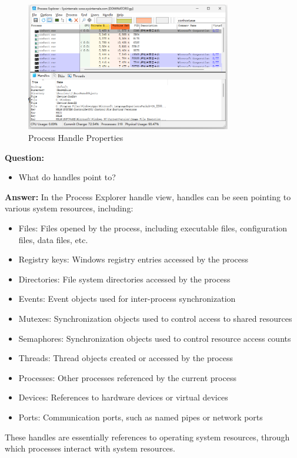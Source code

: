 \documentclass[12pt,a4paper]{article}
\begin{document}
\begin{figure}[H]
    \centering
    \includegraphics[width=0.8\textwidth]{handles.png}
    \caption{Process Handle Properties}
    \label{fig:handles}
\end{figure}

\textbf{Question:}
\begin{itemize}
    \item What do handles point to?
\end{itemize}

\textbf{Answer:}
In the Process Explorer handle view, handles can be seen pointing to various system resources, including:
\begin{itemize}
    \item Files: Files opened by the process, including executable files, configuration files, data files, etc.
    \item Registry keys: Windows registry entries accessed by the process
    \item Directories: File system directories accessed by the process
    \item Events: Event objects used for inter-process synchronization
    \item Mutexes: Synchronization objects used to control access to shared resources
    \item Semaphores: Synchronization objects used to control resource access counts
    \item Threads: Thread objects created or accessed by the process
    \item Processes: Other processes referenced by the current process
    \item Devices: References to hardware devices or virtual devices
    \item Ports: Communication ports, such as named pipes or network ports
\end{itemize}
These handles are essentially references to operating system resources, through which processes interact with system resources.
\end{document}
